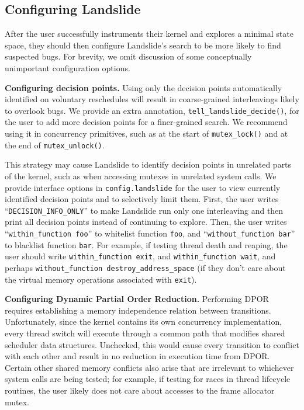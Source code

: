 \documentclass{llncs}
\begin{document}
\squish
\subsection{Configuring Landslide}
\squish
\label{sec:config}

After the user successfully instruments their kernel and explores a minimal state space, they should then configure Landslide's search to be more likely to find suspected bugs. For brevity, we omit discussion of some conceptually unimportant configuration options.

{\bf Configuring decision points.} Using only the decision points automatically identified on voluntary reschedules will result in coarse-grained interleavings likely to overlook bugs. We provide an extra annotation, \texttt{tell\_landslide\_decide()}, for the user to add more decision points for a finer-grained search. We recommend using it in concurrency primitives, such as at the start of \texttt{mutex\_lock()} and at the end of \texttt{mutex\_unlock()}. 

This strategy may cause Landslide to identify decision points in unrelated parts of the kernel, such as when accessing mutexes in unrelated system calls. We provide interface options in \texttt{config.landslide} for the user to view currently identified decision points and to selectively limit them. First, the user writes ``\texttt{DECISION\_INFO\_ONLY}'' to make Landslide run only one interleaving and then print all decision points instead of continuing to explore. Then, the user writes ``\texttt{within\_function foo}'' to whitelist function \texttt{foo}, and ``\texttt{without\_function bar}'' to blacklist function \texttt{bar}. For example, if testing thread death and reaping, the user should write \texttt{within\_function exit}, and \texttt{within\_function wait}, and perhaps \texttt{without\_function destroy\_address\_space} (if they don't care about the virtual memory operations associated with \texttt{exit}).

{\bf Configuring Dynamic Partial Order Reduction.} Performing DPOR \cite{dpor} requires establishing a memory independence relation between transitions.
Unfortunately, since the kernel contains its own concurrency implementation, every thread switch will execute through a common path that modifies shared scheduler data structures.
Unchecked, this would cause every transition to conflict with each other and result in no reduction in execution time from DPOR.
Certain other shared memory conflicts also arise that are irrelevant to whichever system calls are being tested; for example, if testing for races in thread lifecycle routines, the user likely does not care about accesses to the frame allocator mutex.
\end{document}
